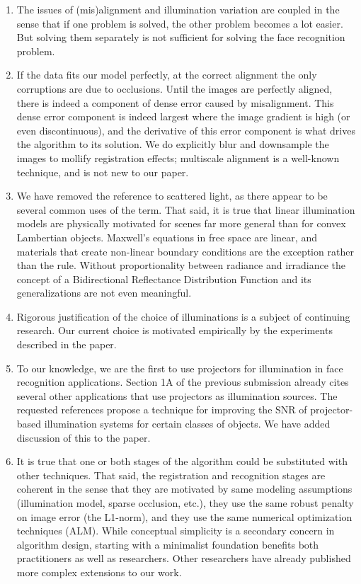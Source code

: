 \documentclass[11pt]{article}
\begin{document}
\begin{enumerate}
\item The issues of (mis)alignment and illumination variation are coupled in the
sense that if one problem is solved, the other problem becomes a lot easier. But solving them
separately is not sufficient for solving the face recognition problem. 

\item If the data fits our model perfectly, at the correct alignment the only
corruptions are due to occlusions.  Until the images are perfectly aligned,
there is indeed a component of dense error caused by misalignment.  This dense
error component is indeed largest where the image gradient is high (or even
discontinuous), and the derivative of this error component is what drives the
algorithm to its solution.  We do explicitly  blur and downsample the images to
mollify registration effects; multiscale alignment is a well-known technique,
and is not new to our paper.  

\item We have removed the reference to scattered light, as there appear to
be several common uses of the term.  That said, it is true that linear illumination
models are physically motivated for scenes far more general than for convex 
Lambertian objects.  Maxwell's equations in free space are linear, and materials
that create non-linear boundary conditions are the exception
rather than the rule.  Without proportionality between radiance and irradiance 
the concept of a Bidirectional Reflectance Distribution Function and its
generalizations are not even meaningful. 

\item Rigorous justification of the choice of illuminations is a subject of 
continuing research.  Our current choice is motivated empirically by the
experiments described in the paper. 

\item To our knowledge, we are the first to use projectors for illumination in
face recognition applications.  Section 1A of the previous submission already
cites several other applications that use projectors as illumination sources.
The requested references propose a technique for improving the SNR of projector-based 
illumination systems for certain classes of objects.  We have added
discussion of this to the paper.

\item  It is true that one or both stages of the algorithm could be substituted
with other techniques.  That said, the registration and recognition stages are
coherent in the sense that they are motivated by same modeling assumptions
(illumination model, sparse occlusion, etc.), they use the same robust penalty
on image error (the L1-norm), and they use the same numerical optimization
techniques (ALM).  While conceptual simplicity is a secondary concern in
algorithm design, starting with a minimalist foundation benefits both
practitioners as well as researchers.  Other researchers have already published
more complex extensions to our work. 


\end{enumerate}
\end{document}
